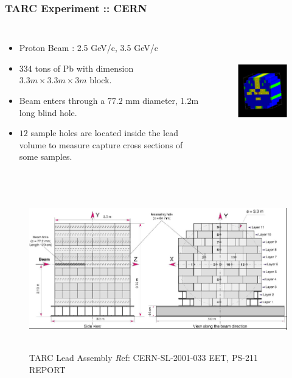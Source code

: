 \documentclass{beamer}
\begin{document}
    \begin{frame}
    \frametitle{TARC Experiment :: CERN}
    \begin{columns}
        \column[t]{55mm}
        \begin{itemize}
            \item Proton Beam : 2.5 GeV/c, 3.5 GeV/c
            \item 334 tons of Pb with dimension $3.3m \times 3.3m \times 3m$ block.
            \item Beam enters through a $77.2$ mm diameter, 1.2m long blind hole.
            \item $12$ sample holes are located inside the lead volume to measure capture cross sections of some samples. 
        \end{itemize}
        \column[t]{50mm}
        \begin{figure}
            \includegraphics[height=50mm, width=45mm] {PICS/TARC_CERN_Lead.png}
        \end{figure}
    \end{columns}    
    \end{frame}

    \begin{frame}
    \begin{figure}
        \vskip -3mm
        \includegraphics[height=70mm, width=115mm] {PICS/TARC_CERN_Lead_Assembly}
        \caption {TARC Lead Assembly {\tiny \textit Ref: CERN-SL-2001-033 EET, PS-211 REPORT}} 
    \end{figure}
    \end{frame}
\end{document}
